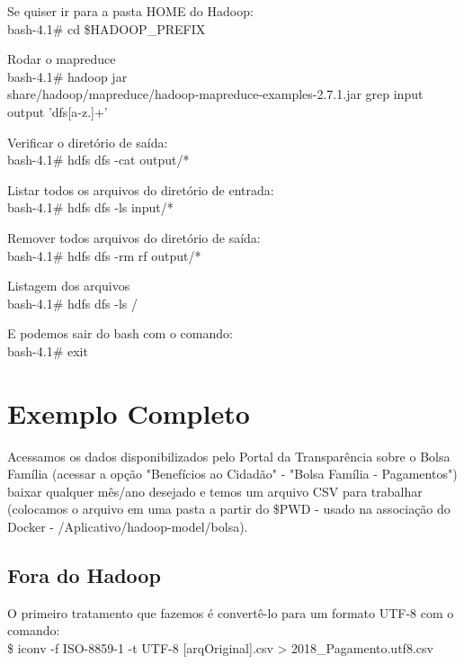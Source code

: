 \documentclass[a4paper,11pt]{article}
\begin{document}
Se quiser ir para a pasta HOME do Hadoop: \\
{\ttfamily bash-4.1\# cd \$HADOOP\_PREFIX}

Rodar o mapreduce \\
{\ttfamily bash-4.1\# hadoop jar \\ share/hadoop/mapreduce/hadoop-mapreduce-examples-2.7.1.jar grep input \\ output 'dfs[a-z.]+'}

Verificar o diretório de saída: \\
{\ttfamily bash-4.1\# hdfs dfs -cat output/*}

Listar todos os arquivos do diretório de entrada: \\
{\ttfamily bash-4.1\# hdfs dfs -ls input/*}

Remover todos arquivos do diretório de saída: \\
{\ttfamily bash-4.1\# hdfs dfs -rm rf  output/*}

Listagem dos arquivos \\
{\ttfamily bash-4.1\# hdfs dfs -ls /}

E podemos sair do bash com o comando: \\
{\ttfamily bash-4.1\# exit}

\section{Exemplo Completo}
Acessamos os dados disponibilizados pelo Portal da Transparência\cite{portaltransp} sobre o Bolsa Família (acessar a opção "Benefícios ao Cidadão" - "Bolsa Família - Pagamentos") baixar qualquer mês/ano desejado e temos um arquivo CSV para trabalhar (colocamos o arquivo em uma pasta a partir do \$PWD - usado na associação do Docker - /Aplicativo/hadoop-model/bolsa).

\subsection{Fora do Hadoop}
O primeiro tratamento que fazemos é convertê-lo para um formato UTF-8 com o comando: \\
{\ttfamily\$ iconv -f ISO-8859-1 -t UTF-8 [arqOriginal].csv > 2018\_Pagamento.utf8.csv}
\end{document}

